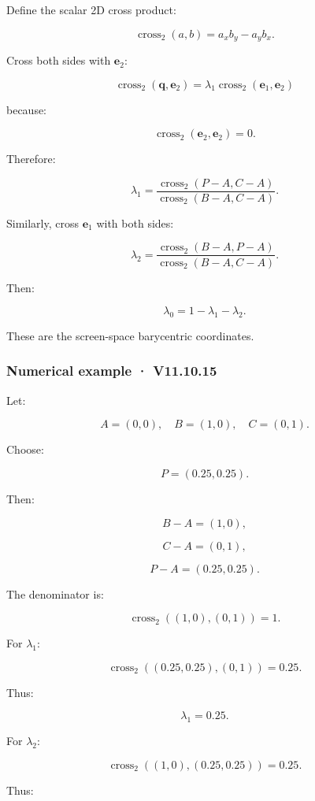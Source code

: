 Define the scalar 2D cross product:

\[
 \boxed{ \operatorname{cross}_2(a,b)=a_xb_y-a_yb_x }.
\]

Cross both sides with \(\mathbf e_2\):

\[
 \operatorname{cross}_2(\mathbf q,\mathbf e_2) = \lambda_1 \operatorname{cross}_2(\mathbf e_1,\mathbf e_2)
\]

because:

\[
 \operatorname{cross}_2(\mathbf e_2,\mathbf e_2)=0.
\]

Therefore:

\[
 \boxed{ \lambda_1= \frac{ \operatorname{cross}_2(P-A,C-A) }{ \operatorname{cross}_2(B-A,C-A) } }.
\]

Similarly, cross \(\mathbf e_1\) with both sides:

\[
 \boxed{ \lambda_2= \frac{ \operatorname{cross}_2(B-A,P-A) }{ \operatorname{cross}_2(B-A,C-A) } }.
\]

Then:

\[
 \boxed{ \lambda_0=1-\lambda_1-\lambda_2 }.
\]

These are the screen-space barycentric coordinates.

\subsubsection{Numerical example · V11.10.15}\label{numerical-example-v11.10.15}

Let:

\[
 A=(0,0),\quad B=(1,0),\quad C=(0,1).
\]

Choose:

\[
 P=(0.25,0.25).
\]

Then:

\[
 B-A=(1,0),
\]

\[
 C-A=(0,1),
\]

\[
 P-A=(0.25,0.25).
\]

The denominator is:

\[
 \operatorname{cross}_2((1,0),(0,1))=1.
\]

For \(\lambda_1\):

\[
 \operatorname{cross}_2((0.25,0.25),(0,1))=0.25.
\]

Thus:

\[
 \lambda_1=0.25.
\]

For \(\lambda_2\):

\[
 \operatorname{cross}_2((1,0),(0.25,0.25))=0.25.
\]

Thus:

